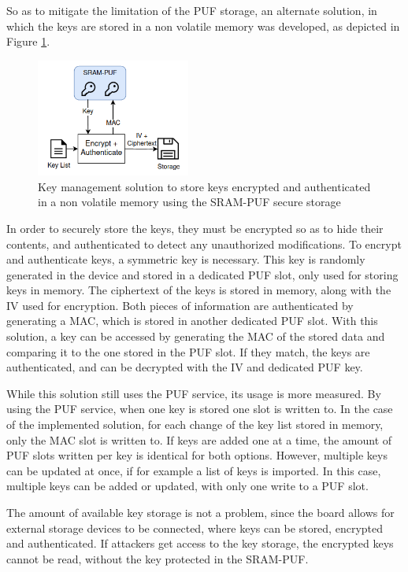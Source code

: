 So as to mitigate the limitation of the PUF storage, an alternate solution, in which the keys are stored in a non volatile memory was developed, as depicted in Figure \ref{fig:implementation:key-management}.
\begin{figure}[h!]
	\centering
	\includegraphics[width=0.45\textwidth]{./Images/key-management.png}
	\caption{Key management solution to store keys encrypted and authenticated in a non volatile memory using the SRAM-PUF secure storage}
	\label{fig:implementation:key-management}
\end{figure}
In order to securely store the keys, they must be encrypted so as to hide their contents, and authenticated to detect any unauthorized modifications.
To encrypt and authenticate keys, a symmetric key is necessary. This key is randomly generated in the device and stored in a dedicated PUF slot, only used for storing keys in memory.
The ciphertext of the keys is stored in memory, along with the IV used for encryption.
Both pieces of information are authenticated by generating a MAC, which is stored in another dedicated PUF slot.
With this solution, a key can be accessed by generating the MAC of the stored data and comparing it to the one stored in the PUF slot. If they match, the keys are authenticated, and can be decrypted with the IV and dedicated PUF key.

While this solution still uses the PUF service, its usage is more measured. By using the PUF service, when one key is stored one slot is written to.
In the case of the implemented solution, for each change of the key list stored in memory, only the MAC slot is written to.
If keys are added one at a time, the amount of PUF slots written per key is identical for both options. However, multiple keys can be updated at once, if for example a list of keys is imported. In this case, multiple keys can be added or updated, with only one write to a PUF slot.

The amount of available key storage is not a problem, since the board allows for external storage devices to be connected, where keys can be stored, encrypted and authenticated. If attackers get access to the key storage, the encrypted keys cannot be read, without the key protected in the SRAM-PUF.

